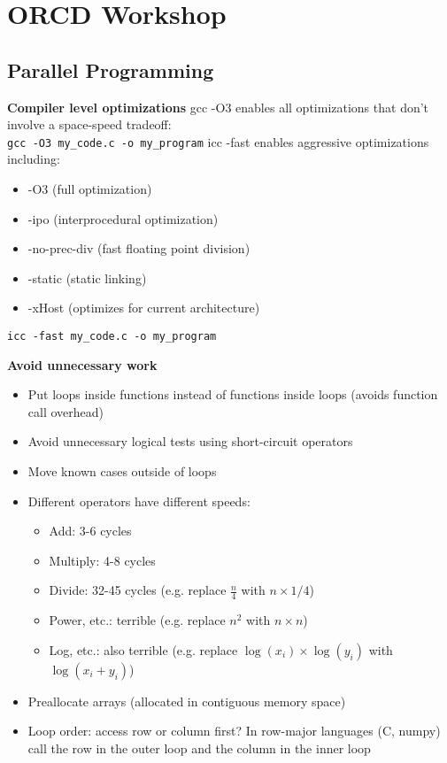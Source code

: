 \section{ORCD Workshop}

\subsection{Parallel Programming}

\textbf{Compiler level optimizations}
gcc -O3 enables all optimizations that don't involve a space-speed tradeoff:\\
\texttt{gcc -O3 my_code.c -o my_program}
icc -fast enables aggressive optimizations including:
\begin{itemize}
\item -O3 (full optimization)
\item -ipo (interprocedural optimization) 
\item -no-prec-div (fast floating point division)
\item -static (static linking)
\item -xHost (optimizes for current architecture)
\end{itemize}
\texttt{icc -fast my_code.c -o my_program}

\textbf{Avoid unnecessary work}
\begin{itemize}
    \item Put loops inside functions instead of functions inside loops (avoids function call overhead)
    \item Avoid unnecessary logical tests using short-circuit operators
    \item Move known cases outside of loops
    \item Different operators have different speeds:
    \begin{itemize}
        \item Add: 3-6 cycles
        \item Multiply: 4-8 cycles
        \item Divide: 32-45 cycles (e.g. replace $\frac{n}{4}$ with $n \times 1/4$)
        \item Power, etc.: terrible (e.g. replace $n^2$ with $n \times n$)
        \item Log, etc.: also terrible (e.g. replace $\log(x_i) \times \log(y_i)$ with $\log(x_i + y_i)$)
    \end{itemize}
    \item Preallocate arrays (allocated in contiguous memory space)
    \item Loop order: access row or column first? In row-major languages (C, numpy) call the row in the outer loop and the column in the inner loop
\end{itemize}

